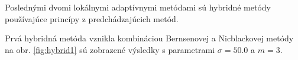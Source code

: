\documentclass[a4paper,11pt,oneside]{article}%
\begin{document}
Poslednými dvomi lokálnymi adaptívnymi metódami sú hybridné metódy používajúce princípy z predchádzajúcich metód. 
 
Prvá hybridná metóda vznikla kombináciou Bernsenovej a Nicblackovej metódy na obr. \ref{fig:hybrid1}  sú zobrazené výsledky s parametrami $\sigma = 50.0$ a $m = 3$.

\begin{figure}[H]  
    \hspace{5px}

\end{figure}
\end{document}

